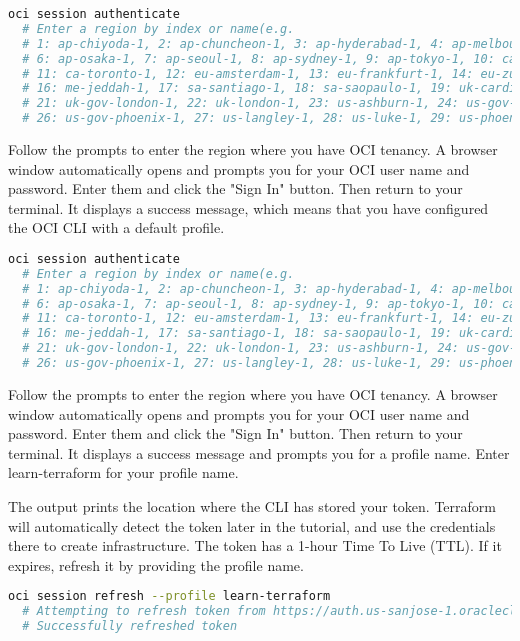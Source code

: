 \documentclass[../main.tex]{subfiles}
\begin{document}
\begin{lstlisting}[language=bash, caption={Configure the OCI CLI from your terminal}, label={lst:configure-the-oci-cli-from-your-terminal}]
  oci session authenticate
  # Enter a region by index or name(e.g.
  # 1: ap-chiyoda-1, 2: ap-chuncheon-1, 3: ap-hyderabad-1, 4: ap-melbourne-1, 5: ap-mumbai-1,
  # 6: ap-osaka-1, 7: ap-seoul-1, 8: ap-sydney-1, 9: ap-tokyo-1, 10: ca-montreal-1,
  # 11: ca-toronto-1, 12: eu-amsterdam-1, 13: eu-frankfurt-1, 14: eu-zurich-1, 15: me-dubai-1,
  # 16: me-jeddah-1, 17: sa-santiago-1, 18: sa-saopaulo-1, 19: uk-cardiff-1, 20: uk-gov-cardiff-1,
  # 21: uk-gov-london-1, 22: uk-london-1, 23: us-ashburn-1, 24: us-gov-ashburn-1, 25: us-gov-chicago-1,
  # 26: us-gov-phoenix-1, 27: us-langley-1, 28: us-luke-1, 29: us-phoenix-1, 30: us-sanjose-1):
\end{lstlisting}

Follow the prompts to enter the region where you have \gls{OCI} tenancy. A browser window automatically opens and prompts you for your \gls{OCI} user name and password. Enter them and click the "Sign In" button. Then return to your terminal. It displays a success message, which means that you have configured the \gls{OCI} \gls{CLI} with a default profile.

\begin{lstlisting}[language=bash]
  oci session authenticate
  # Enter a region by index or name(e.g.
  # 1: ap-chiyoda-1, 2: ap-chuncheon-1, 3: ap-hyderabad-1, 4: ap-melbourne-1, 5: ap-mumbai-1,
  # 6: ap-osaka-1, 7: ap-seoul-1, 8: ap-sydney-1, 9: ap-tokyo-1, 10: ca-montreal-1,
  # 11: ca-toronto-1, 12: eu-amsterdam-1, 13: eu-frankfurt-1, 14: eu-zurich-1, 15: me-dubai-1,
  # 16: me-jeddah-1, 17: sa-santiago-1, 18: sa-saopaulo-1, 19: uk-cardiff-1, 20: uk-gov-cardiff-1,
  # 21: uk-gov-london-1, 22: uk-london-1, 23: us-ashburn-1, 24: us-gov-ashburn-1, 25: us-gov-chicago-1,
  # 26: us-gov-phoenix-1, 27: us-langley-1, 28: us-luke-1, 29: us-phoenix-1, 30: us-sanjose-1):
\end{lstlisting}

Follow the prompts to enter the region where you have \gls{OCI} tenancy. A browser window automatically opens and prompts you for your \gls{OCI} user name and password. Enter them and click the "Sign In" button. Then return to your terminal. It displays a success message and prompts you for a profile name.
Enter learn-terraform for your profile name.

The output prints the location where the CLI has stored your token. Terraform will automatically detect the token later in the tutorial, and use the credentials there to create infrastructure. The token has a 1-hour Time To Live (TTL). If it expires, refresh it by providing the profile name.
\begin{lstlisting}[language=bash]
  oci session refresh --profile learn-terraform
  # Attempting to refresh token from https://auth.us-sanjose-1.oraclecloud.com/v1/authentication/refresh
  # Successfully refreshed token
\end{lstlisting}
\end{document}
